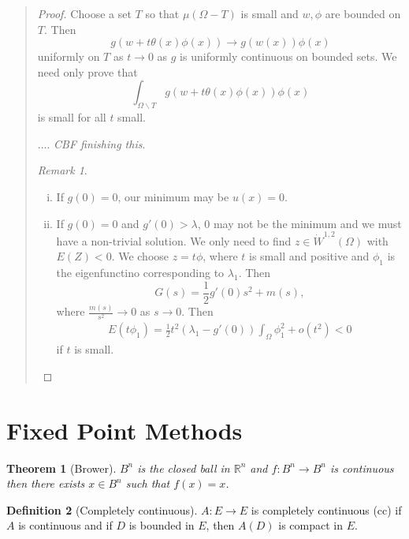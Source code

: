 \documentclass[10pt, oneside, reqno]{amsart}
\theoremstyle{plain}%
\newtheorem{thm}{Theorem}[section]
\numberwithin{equation}{section}
\theoremstyle{definition}
\newtheorem{defn}[thm]{Definition}
\theoremstyle{remark}
\newtheorem*{rem}{Remark}
\newcommand{\R}{\mathbb{R}}
\begin{document}
\begin{quote}
\begin{proof}
    Choose a set $T$ so that $\mu(\Omega - T)$ is small and $w, \phi$ are bounded on $T$. Then \[
        g(w + t \theta(x) \phi(x)) \rightarrow g(w(x)) \phi(x)
    \] uniformly on $T$ as $t \rightarrow 0$ as $g$ is uniformly continuous on bounded sets.  We need only prove that \[
        \int_{\Omega \backslash T} g(w + t \theta(x) \phi(x)) \phi(x)
    \] is small for all $t$ small.  
    
    .... \emph{CBF finishing this}.
    
    \begin{rem}{\ }
        \begin{enumerate}[(i)]
            \item If $g(0) = 0$, our minimum may be $u(x) = 0$.  
            \item If $g(0) = 0$ and $g'(0) > \lambda$, $0$ may not be the minimum and we must have a non-trivial solution.  We only need to find $z \in \dot W^{1, 2}(\Omega)$ with $E(Z) < 0$.  We choose $z = t \phi$, where $t$ is small and positive and $\phi_1$ is the eigenfunctino corresponding to $\lambda_1$.  Then \[
                G(s) = \frac{1}{2} g'(0) s^2 + m(s),
            \] where $\frac{m(s)}{s^2} \rightarrow 0$ as $s \rightarrow 0$.  Then \begin{align*}
            E(t \phi_1) = \frac{1}{2} t^2 \left( \lambda_1 - g'(0) \right) \int_\Omega \phi_1^2 + o(t^2)  < 0   
            \end{align*} if $t$ is small.
        \end{enumerate}
    \end{rem}
\end{proof}  


\end{quote}


\section{Fixed Point Methods} %
\label{sec:fixed_point_methods}
\begin{thm}[Brower]
    $B^n$ is the closed ball in $\R^n$ and $f: B^n \rightarrow B^n$ is continuous then there exists $x \in B^n$ such that $f(x) = x$.  
\end{thm}


\begin{defn}[Completely continuous]
    $A: E \rightarrow E$ is completely continuous (cc) if $A$ is continuous and if $D$ is bounded in $E$, then $A(D)$ is compact in $E$.  
\end{defn}
\end{document}

